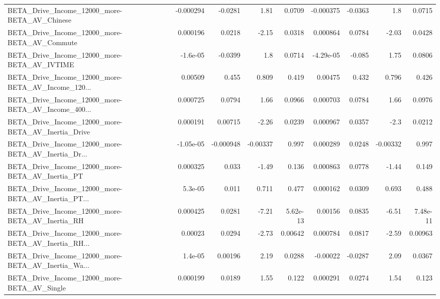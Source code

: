 \begin{tabular}{lrrrrrrrr}
BETA\_Drive\_Income\_12000\_more-BETA\_AV\_Chinese       &   -0.000294 &      -0.0281 &     1.81 &   0.0709 &  -0.000375 &     -0.0363 &          1.8 &        0.0715 \\
BETA\_Drive\_Income\_12000\_more-BETA\_AV\_Commute       &    0.000196 &       0.0218 &    -2.15 &   0.0318 &   0.000864 &      0.0784 &        -2.03 &        0.0428 \\
BETA\_Drive\_Income\_12000\_more-BETA\_AV\_IVTIME        &    -1.6e-05 &      -0.0399 &      1.8 &   0.0714 &  -4.29e-05 &      -0.085 &         1.75 &        0.0806 \\
BETA\_Drive\_Income\_12000\_more-BETA\_AV\_Income\_120... &     0.00509 &        0.455 &    0.809 &    0.419 &    0.00475 &       0.432 &        0.796 &         0.426 \\
BETA\_Drive\_Income\_12000\_more-BETA\_AV\_Income\_400... &    0.000725 &       0.0794 &     1.66 &   0.0966 &   0.000703 &      0.0784 &         1.66 &        0.0976 \\
BETA\_Drive\_Income\_12000\_more-BETA\_AV\_Inertia\_Drive &    0.000191 &      0.00715 &    -2.26 &   0.0239 &   0.000967 &      0.0357 &         -2.3 &        0.0212 \\
BETA\_Drive\_Income\_12000\_more-BETA\_AV\_Inertia\_Dr... &   -1.05e-05 &    -0.000948 & -0.00337 &    0.997 &   0.000289 &      0.0248 &     -0.00332 &         0.997 \\
BETA\_Drive\_Income\_12000\_more-BETA\_AV\_Inertia\_PT    &    0.000325 &        0.033 &    -1.49 &    0.136 &   0.000863 &      0.0778 &        -1.44 &         0.149 \\
BETA\_Drive\_Income\_12000\_more-BETA\_AV\_Inertia\_PT... &     5.3e-05 &        0.011 &    0.711 &    0.477 &   0.000162 &      0.0309 &        0.693 &         0.488 \\
BETA\_Drive\_Income\_12000\_more-BETA\_AV\_Inertia\_RH    &    0.000425 &       0.0281 &    -7.21 & 5.62e-13 &    0.00156 &      0.0835 &        -6.51 &      7.48e-11 \\
BETA\_Drive\_Income\_12000\_more-BETA\_AV\_Inertia\_RH... &     0.00023 &       0.0294 &    -2.73 &  0.00642 &   0.000784 &      0.0817 &        -2.59 &       0.00963 \\
BETA\_Drive\_Income\_12000\_more-BETA\_AV\_Inertia\_Wa... &     1.4e-05 &      0.00196 &     2.19 &   0.0288 &   -0.00022 &     -0.0287 &         2.09 &        0.0367 \\
BETA\_Drive\_Income\_12000\_more-BETA\_AV\_Single        &    0.000199 &       0.0189 &     1.55 &    0.122 &   0.000291 &      0.0274 &         1.54 &         0.123 \\

\end{tabular}

